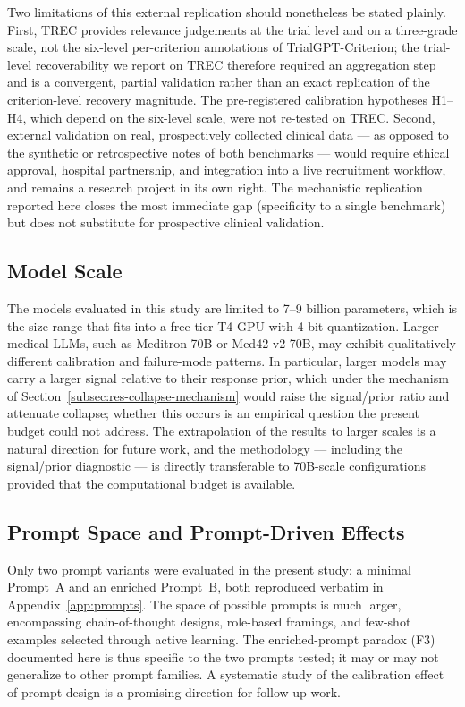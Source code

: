Two limitations of this external replication should nonetheless be 
stated plainly. First, TREC provides relevance judgements at the trial 
level and on a three-grade scale, not the six-level per-criterion 
annotations of TrialGPT-Criterion; the trial-level recoverability we 
report on TREC therefore required an aggregation step and is a 
convergent, partial validation rather than an exact replication of the 
criterion-level recovery magnitude. The pre-registered calibration 
hypotheses H1--H4, which depend on the six-level scale, were not 
re-tested on TREC. Second, external validation on real, prospectively 
collected clinical data --- as opposed to the synthetic or 
retrospective notes of both benchmarks --- would require ethical 
approval, hospital partnership, and integration into a live recruitment 
workflow, and remains a research project in its own right. The 
mechanistic replication reported here closes the most immediate gap 
(specificity to a single benchmark) but does not substitute for 
prospective clinical validation.

\subsection{Model Scale}
\label{subsec:conc-limitations-scale}

The models evaluated in this study are limited to 7--9 billion 
parameters, which is the size range that fits into a free-tier T4 GPU 
with 4-bit quantization. Larger medical LLMs, such as Meditron-70B or 
Med42-v2-70B, may exhibit qualitatively different calibration and 
failure-mode patterns. In particular, larger models may carry a larger 
signal relative to their response prior, which under the mechanism of 
Section~\ref{subsec:res-collapse-mechanism} would raise the 
signal/prior ratio and attenuate collapse; whether this occurs is an 
empirical question the present budget could not address. The 
extrapolation of the results to larger scales is a natural direction 
for future work, and the methodology --- including the signal/prior 
diagnostic --- is directly transferable to 70B-scale configurations 
provided that the computational budget is available.

\subsection{Prompt Space and Prompt-Driven Effects}
\label{subsec:conc-limitations-prompts}

Only two prompt variants were evaluated in the present study: a 
minimal Prompt~A and an enriched Prompt~B, both reproduced verbatim 
in Appendix~\ref{app:prompts}. The space of possible prompts is much 
larger, encompassing chain-of-thought designs, role-based framings, 
and few-shot examples selected through active learning. The 
enriched-prompt paradox (F3) documented here is thus specific to the 
two prompts tested; it may or may not generalize to other prompt 
families. A systematic study of the calibration effect of prompt 
design is a promising direction for follow-up work.

